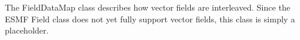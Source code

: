 

The FieldDataMap class describes how vector fields are interleaved.
Since the ESMF Field class does not yet fully support vector fields,
this class is simply a placeholder.  


